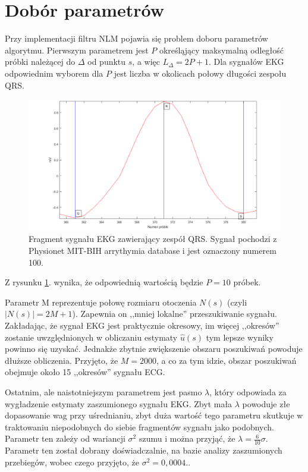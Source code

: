 \section{Dobór parametrów}
\label{ch:parametry}

Przy implementacji filtru NLM pojawia się problem doboru parametrów algorytmu. Pierwszym parametrem jest $P$ określąjący maksymalną odległość próbki należącej do $\Delta$ od punktu $s$, a więc $L_\Delta=2P+1$. Dla sygnałów EKG odpowiednim wyborem dla $P$ jest liczba w okolicach połowy długości zespołu QRS.

\begin{figure}[!htb]
	\begin{center}
		\includegraphics[width=15cm,clip]
		{img/qrs.png}
	\end{center}
	\caption{Fragment sygnału EKG zawierający zespół QRS. Sygnał pochodzi z Physionet MIT-BIH arrythymia database i jest oznaczony numerem 100.\cite{mitbih} }
	\label{rys:qrs}
\end{figure}
Z rysunku \ref{rys:qrs}. wynika, że odpowiednią wartością będzie $P=10$ próbek.

Parametr M reprezentuje połowę rozmiaru otoczenia $N(s)$ (czyli $|N(s)| = 2M+1$). Zapewnia on ,,mniej lokalne''  przeszukiwanie sygnału. Zakładając, że sygnał EKG jest praktycznie okresowy, im więcej ,,okresów'' zostanie uwzględnionych w obliczaniu estymaty $\hat{u}(s)$ tym lepsze wyniky powinno się uzyskać. Jednakże zbytnie zwiększenie obszaru poszukiwań powoduje dłuższe obliczenia. Przyjęto, że $M=2000$, a co za tym idzie, obszar poszukiwań obejmuje około 15 ,,okresów'' sygnału ECG.

Ostatnim, ale naistotniejszym parametrem jest pasmo $\lambda$, który odpowiada za wygładzenie estymaty zaszumionego sygnału EKG. Zbyt mała $\lambda$ powoduje złe dopasowanie wag przy uśrednianiu, zbyt duża wartość tego parametru skutkuje w traktowaniu niepodobnych do siebie fragmentów sygnału jako podobnych. Parametr ten zależy od wariancji $\sigma^2$ szumu i można przyjąć, że $\lambda=\frac{6}{10}\sigma$. Parametr ten został dobrany doświadczalnie, na bazie analizy zaszumionych przebiegów, wobec czego przyjęto, że $\sigma^2=0,0004$.\cite{tracey2012nonlocal}.